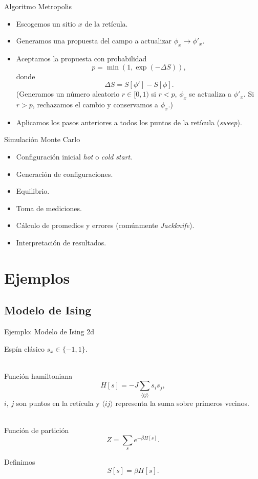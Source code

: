 \documentclass[11pt]{beamer}
\begin{document}
\begin{frame}{Algoritmo Metropolis}
    \begin{itemize}
        \item Escogemos un sitio $x$ de la retícula.
        \item Generamos una propuesta del campo a actualizar $\phi_x \to \phi'_x$.
        \item Aceptamos la propuesta con probabilidad 
        $$ p = \min\left(1, \exp\left(-\Delta S\right)\right),$$
           donde
        $$ \Delta S = S[\phi'] - S[\phi].$$        
        (Generamos un número aleatorio $r\in[0,1)$ si $r<p$, $\phi_x$ se actualiza a $\phi'_x$. Si $r>p$, rechazamos el cambio y conservamos a $\phi_x$.)
      
      	\item Aplicamos los pasos anteriores a todos los puntos de la retícula (\emph{sweep}). 
    \end{itemize}
\end{frame}

\begin{frame}{Simulación Monte Carlo}

    \begin{itemize}
    		\item Configuración inicial \emph{hot} o \emph{cold} \emph{start}.
        \item Generación de configuraciones.
        \item Equilibrio.
        \item Toma de mediciones.
        \item Cálculo de promedios y errores (comúnmente \emph{Jackknife}).
        \item Interpretación de resultados.
    \end{itemize}

\end{frame}

\section{Ejemplos}
\subsection{Modelo de Ising}
\begin{frame}{Ejemplo: Modelo de Ising 2d}

Espín clásico $s_x\in\{-1,1\}$. \\~

Función hamiltoniana
$$ H[s] = -J\sum_{\langle ij \rangle} s_i s_j,$$
$i$, $j$ son puntos en la retícula y $\langle ij \rangle$ representa la suma sobre primeros vecinos.\\~

Función de partición
$$ Z = \sum_s e^{-\beta H[s]}.$$

Definimos
$$S[s] = \beta H[s].$$

\end{frame}
\end{document}
